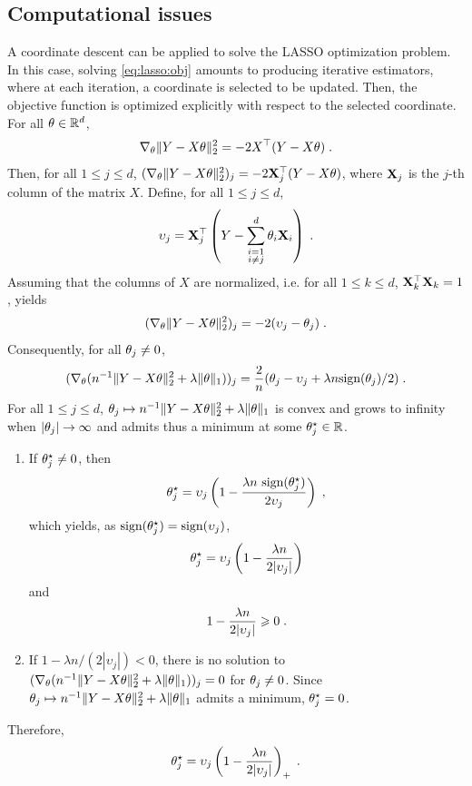 \subsection{Computational issues}
A coordinate descent can be applied to solve the LASSO optimization problem. In this case, solving \eqref{eq:lasso:obj} amounts to producing iterative estimators, where at each iteration, a coordinate is selected to be updated. Then, the objective function  is optimized explicitly  with respect to the selected coordinate. For all $\theta \in \mathbb{R}^d$,  
\[
\nabla_\theta \|Y - X\theta\|_2^2 = - 2 X^\top (Y-X\theta)\;.
\]
Then, for all $1\leqslant j \leqslant d$, $(\nabla_\theta \|Y - X\theta\|_2^2)_j = -2 {\bf X}^\top_j (Y-X\theta)$, where ${\bf X}_j$ is the $j$-th column of the matrix $X$. 
Define, for all $1\leqslant j \leqslant d$,
\[
\upsilon_{j}={\bf X}^\top_{j}\left(Y-\sum_{\substack{i=1\\ i\neq j}}^d\theta_{i}{\bf X}_{i}\right)\;.
\]
Assuming that the columns of $X$ are normalized, i.e. for all $1\leqslant k \leqslant d$, ${\bf X}^\top_{k}{\bf X}_{k}=1$, yields
\[
(\nabla_\theta \|Y - X\theta\|_2^2)_j = -2( \upsilon_j - \theta_j)\;.
\]
Consequently, for all $\theta_j \neq 0$, 
\[
(\nabla_\theta ( n^{-1}\|Y - X\theta\|_2^2 +  \lambda\|\theta\|_1))_j= \frac{2}{n}( \theta_j - \upsilon_j + \lambda n\textrm{sign}(\theta_j)/2)\;.
\]
For all $1\leqslant j\leqslant d$,  $\theta_j \mapsto  n^{-1}\|Y - X\theta\|_2^2 + \lambda\|\theta\|_1$ is convex and grows to infinity when $|\theta_j|\to \infty$ and admits thus a minimum at some $\theta_j^{\star}\in\mathbb{R}$. 
\begin{enumerate}[-]
\item If $\theta_j^{\star} \neq 0$, then
\[
\theta_j^{\star} = \upsilon_j\left( 1 - \frac{\lambda n~\textrm{sign}(\theta_j^{\star})}{2 \upsilon_j}\right)\;,
\]
which yields, as  $\textrm{sign}(\theta_j^{\star}) = \textrm{sign}(\upsilon_j)$,
\[
\theta_j^{\star} = \upsilon_j\left(1 - \frac{\lambda n }{2 |\upsilon_j|}\right)
\]
and
\[
1 - \frac{\lambda n }{2 |\upsilon_j|} \geqslant 0\;.
\]
\item If $1 - \lambda n/(2 |\upsilon_j|)<0$, there is no solution to $(\nabla_\theta ( n^{-1}\|Y - X\theta\|_2^2 +  \lambda\|\theta\|_1))_j=0$ for $\theta_j \neq 0$.  Since $\theta_j \mapsto  n^{-1}\|Y - X\theta\|_2^2 + \lambda\|\theta\|_1$ admits a minimum, $\theta_j^{\star}=0$. 
\end{enumerate}
Therefore,
\[
\theta_j^{\star} = \upsilon_j\left( 1 - \frac{\lambda n}{2 |\upsilon_j|}\right)_+\;.
\]
